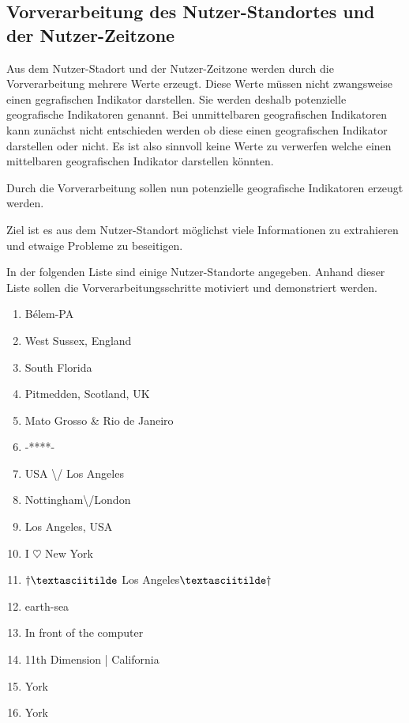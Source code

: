 		\subsection{Vorverarbeitung des Nutzer-Standortes und der Nutzer-Zeitzone}

			Aus dem Nutzer-Stadort und der Nutzer-Zeitzone werden durch die Vorverarbeitung mehrere Werte erzeugt. 
			Diese Werte müssen nicht zwangsweise einen gegrafischen Indikator darstellen. 
			Sie werden deshalb potenzielle geografische Indikatoren genannt.
			Bei unmittelbaren geografischen Indikatoren kann zunächst nicht entschieden werden ob diese einen geografischen Indikator darstellen oder nicht.
			Es ist also sinnvoll keine Werte zu verwerfen welche einen mittelbaren geografischen Indikator darstellen könnten.

			Durch die Vorverarbeitung sollen nun potenzielle geografische Indikatoren erzeugt werden.
			
			Ziel ist es aus dem Nutzer-Standort möglichst viele Informationen zu extrahieren und etwaige Probleme zu beseitigen.

			In der folgenden Liste sind einige Nutzer-Standorte angegeben. 
			Anhand dieser Liste sollen die Vorverarbeitungsschritte motiviert und demonstriert werden.

			\begin{multicols}{2}
			\begin{enumerate}
				\item Bélem-PA
				\item West Sussex, England
				\item South Florida
				\item Pitmedden,  Scotland, UK
				\item Mato Grosso \& Rio de Janeiro
				\item -****-
				\item USA \textbackslash/ Los Angeles
				\item Nottingham\textbackslash/London
				\item Los Angeles, USA
				\item I $\heartsuit$ New York 
				\item $\dagger\textasciitilde$ Los Angeles$\textasciitilde\dagger$
				\item earth-sea
				\item In front of the computer
				\item 11th Dimension | California
				\item York
				\item York
			\end{enumerate}
			\end{multicols}
				

